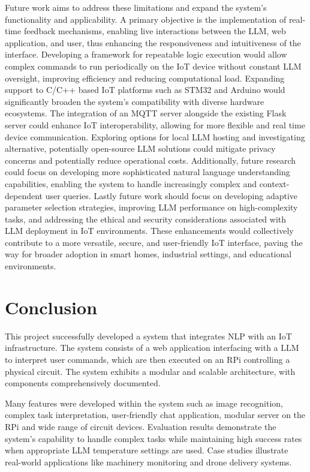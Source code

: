 \documentclass{ieeeaccess}
\begin{document}
Future work aims to address these limitations and expand the system's functionality and applicability. A primary objective is the implementation of real-time feedback mechanisms, enabling live interactions between the LLM, web application, and user, thus enhancing the responsiveness and intuitiveness of the interface. Developing a framework for repeatable logic execution would allow complex commands to run periodically on the IoT device without constant LLM oversight, improving efficiency and reducing computational load. Expanding support to C/C++ based IoT platforms such as STM32 and Arduino would significantly broaden the system's compatibility with diverse hardware ecosystems. The integration of an MQTT server alongside the existing Flask server could enhance IoT interoperability, allowing for more flexible and real time device communication. Exploring options for local LLM hosting and investigating alternative, potentially open-source LLM solutions could mitigate privacy concerns and potentially reduce operational costs. Additionally, future research could focus on developing more sophisticated natural language understanding capabilities, enabling the system to handle increasingly complex and context-dependent user queries. Lastly future work should focus on developing adaptive parameter selection strategies, improving LLM performance on high-complexity tasks, and addressing the ethical and security considerations associated with LLM deployment in IoT environments. These enhancements would collectively contribute to a more versatile, secure, and user-friendly IoT interface, paving the way for broader adoption in smart homes, industrial settings, and educational environments. 

\section{Conclusion}\label{sec:conclusion}
This project successfully developed a system that integrates NLP with an IoT infrastructure. The system consists of a web application interfacing with a LLM to interpret user commands, which are then executed on an RPi controlling a physical circuit. The system exhibits a modular and scalable architecture, with components comprehensively documented. 

Many features were developed within the system such as image recognition, complex task interpretation, user-friendly chat application, modular server on the RPi and wide range of circuit devices. Evaluation results demonstrate the system's capability to handle complex tasks while maintaining high success rates when appropriate LLM temperature settings are used. Case studies illustrate real-world applications like machinery monitoring and drone delivery systems.
\end{document}
